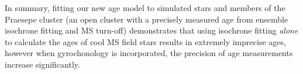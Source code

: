 In summary, fitting our new age model to simulated stars and members of the
Praesepe cluster (an open cluster with a precisely measured age from ensemble
isochrone fitting and MS turn-off) demonstrates that using isochrone fitting
{\it alone} to calculate the ages of cool MS field stars results in
extremely imprecise ages, however when gyrochonology is incorporated, the
precision of age measurements increase significantly.


